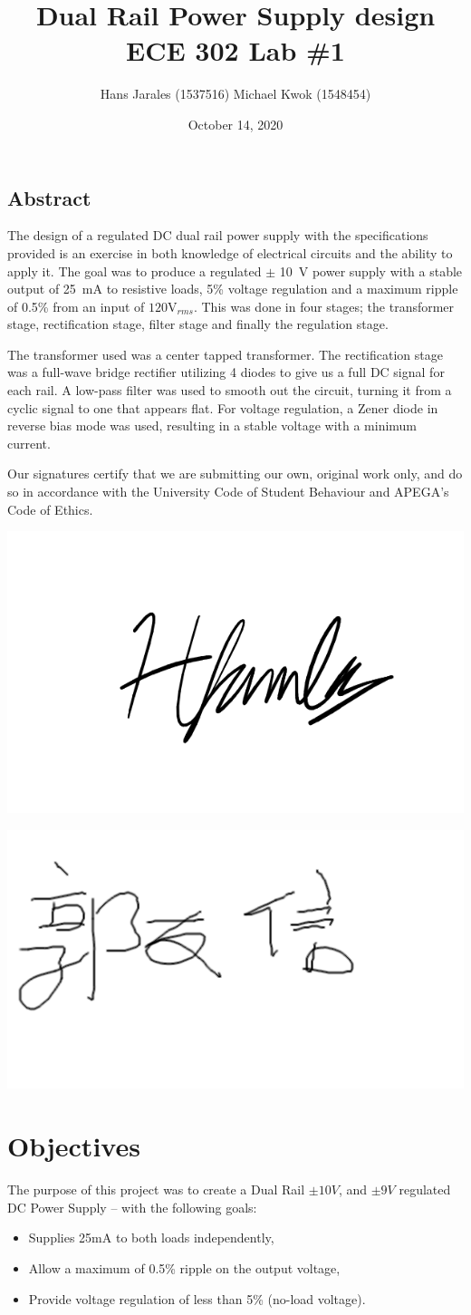 \documentclass[12pt]{article}
\title{Dual Rail Power Supply design\\ECE 302 Lab \#1}
\author{Hans Jarales (1537516) Michael Kwok (1548454)}
\date{October 14, 2020}
\begin{document}
\begin{titlepage}
\maketitle
\section*{Abstract}
The design of a regulated DC dual rail power supply with the specifications provided is an exercise in both knowledge of electrical circuits and the ability to apply it. The goal was to produce a regulated \(\pm\) \SI{10}{\volt} power supply with a stable output of \SI{25}{\milli\ampere} to resistive loads, 5\% voltage regulation and a maximum ripple of 0.5\% from an input of \(120\si{\volt}_{rms}\). This was done in four stages; the transformer stage, rectification stage, filter stage and finally the regulation stage.

The transformer used was a center tapped transformer. The rectification stage was a full-wave bridge rectifier utilizing 4 diodes to give us a full DC signal for each rail. A low-pass filter was used to smooth out the circuit, turning it from a cyclic signal to one that appears flat. For voltage regulation, a Zener diode in reverse bias mode was used, resulting in a stable voltage with a minimum current.

Our signatures certify that we are submitting our own, original work only, and do so in accordance with the University Code of Student Behaviour and APEGA's Code of Ethics.

\includegraphics[width=0.2\linewidth]{hanssignature.png}

\includegraphics[width=0.2\linewidth]{bepis.png}
\end{titlepage}
\newpage
\section{Objectives}
The purpose of this project was to create a Dual Rail $\pm10V$, and $\pm 9V$ regulated DC Power Supply -- with the following goals:
\begin{itemize}
    \item Supplies 25mA to both loads independently,
    \item Allow a maximum of 0.5\% ripple on the output voltage,
    \item Provide voltage regulation of less than 5\% (no-load voltage).
\end{itemize}
\end{document}
